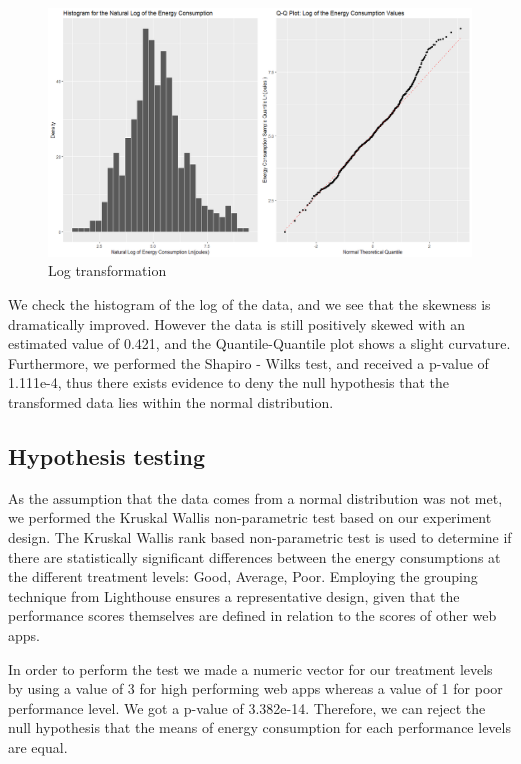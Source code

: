 \begin{figure}[H]
  \includegraphics[width=\linewidth]{./NewImages/Fig_10_Log_Transform.png}
  \caption{Log transformation}
  \label{fig:histqq-log}
\end{figure}

We check the histogram of the log of the data, and we see that the skewness is dramatically improved. However the data is still positively skewed with an estimated value of 0.421, and the Quantile-Quantile plot shows a slight curvature. Furthermore, we performed the Shapiro - Wilks test, and received a p-value of 1.111e-4, thus there exists evidence to deny the null hypothesis that the transformed data lies within the normal distribution.


\subsection{Hypothesis testing}
As the assumption that the data comes from a normal distribution was not met, we performed the Kruskal Wallis non-parametric test based on our experiment design. 
The Kruskal Wallis rank based non-parametric test is used to determine if there are statistically significant differences between the energy consumptions at the different treatment levels: Good, Average, Poor. Employing the grouping technique from Lighthouse ensures a representative design, given that the performance scores themselves are defined in relation to the scores of other web apps.

In order to perform the test we made a numeric vector for our treatment levels by using a value of 3 for high performing web apps whereas a value of 1 for poor performance level. We got a p-value of 3.382e-14. Therefore, we can reject the null hypothesis that the means of energy consumption for each performance levels are equal.

